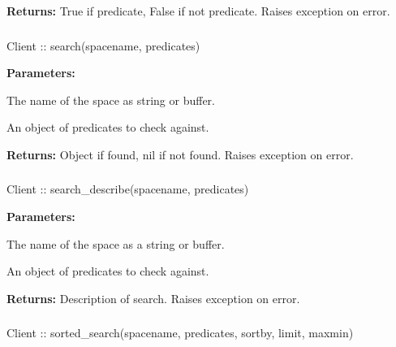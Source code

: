 \noindent\textbf{Returns:}
True if predicate, False if not predicate.  Raises exception on error.

\subsubsection{}
\label{api:nodejs:search}
\begin{javascriptcode}
Client :: search(spacename, predicates)
\end{javascriptcode}
\funcdesc 

\noindent\textbf{Parameters:}
\begin{description}[labelindent=\widthof{{\code{predicates}}},leftmargin=*,noitemsep,nolistsep,align=right]
\item[\code{spacename}] The name of the space as string or buffer.
\item[\code{predicates}] An object of predicates to check against.
\end{description}

\noindent\textbf{Returns:}
Object if found, nil if not found.  Raises exception on error.

\subsubsection{}
\label{api:nodejs:search_describe}
\begin{javascriptcode}
Client :: search_describe(spacename, predicates)
\end{javascriptcode}
\funcdesc 

\noindent\textbf{Parameters:}
\begin{description}[labelindent=\widthof{{\code{predicates}}},leftmargin=*,noitemsep,nolistsep,align=right]
\item[\code{spacename}] The name of the space as a string or buffer.
\item[\code{predicates}] An object of predicates to check against.
\end{description}

\noindent\textbf{Returns:}
Description of search.  Raises exception on error.

\subsubsection{}
\label{api:nodejs:sorted_search}
\begin{javascriptcode}
Client :: sorted_search(spacename, predicates, sortby, limit, maxmin)
\end{javascriptcode}
\funcdesc 

